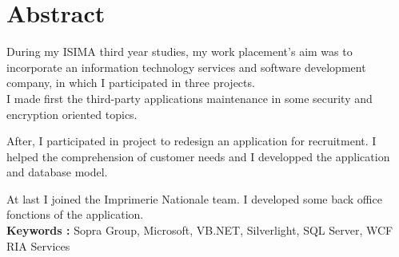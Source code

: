 \cleardoublepage

\chapter*{Abstract}

\thispagestyle{empty}



During my ISIMA third year studies, my work placement's aim was to incorporate an information technology services and software development company, in which I participated in three projects.
\\

I made first the third-party applications maintenance in some security and encryption oriented topics.

After, I participated in project to redesign an application for recruitment.
I helped the comprehension of customer needs and I developped the application and database model.

At last I joined the Imprimerie Nationale team.
I developed some back office fonctions of the application.
\\

\textbf{Keywords : } Sopra Group, Microsoft, VB.NET, Silverlight, SQL Server, WCF RIA Services